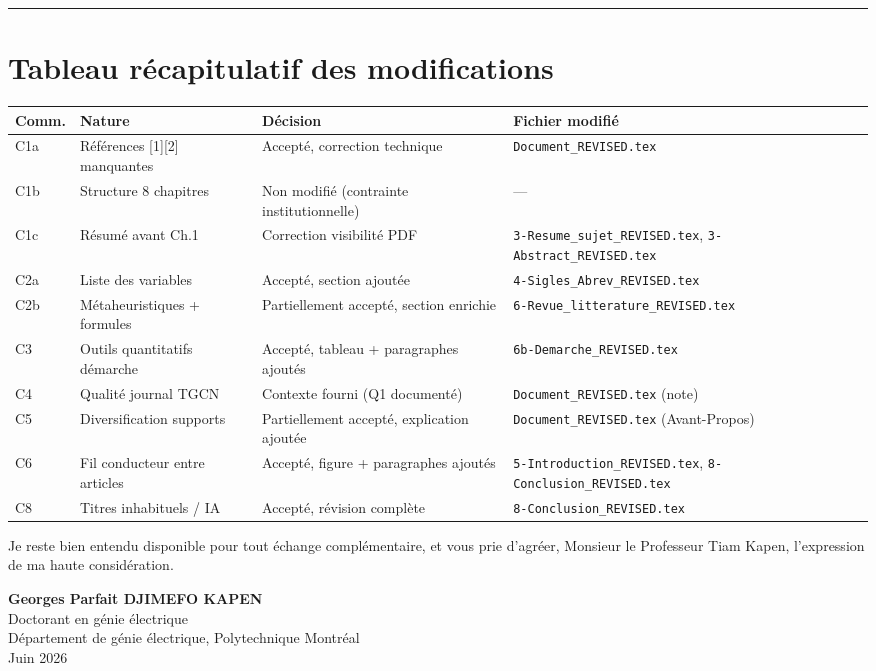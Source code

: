 \documentclass[12pt,a4paper]{article}
\begin{document}
\bigskip
\hrule
\bigskip

\section*{Tableau récapitulatif des modifications}

\begin{center}
\small
\begin{tabular}{p{1.5cm} p{4cm} p{3.5cm} p{4cm}}
\toprule
\textbf{Comm.} & \textbf{Nature} & \textbf{Décision} & \textbf{Fichier modifié} \\
\midrule
C1a & Références [1][2] manquantes & Accepté, correction technique & \texttt{Document\_REVISED.tex} \\
C1b & Structure 8 chapitres & Non modifié (contrainte institutionnelle) & --- \\
C1c & Résumé avant Ch.1 & Correction visibilité PDF & \texttt{3-Resume\_sujet\_REVISED.tex}, \texttt{3-Abstract\_REVISED.tex} \\
C2a & Liste des variables & Accepté, section ajoutée & \texttt{4-Sigles\_Abrev\_REVISED.tex} \\
C2b & Métaheuristiques + formules & Partiellement accepté, section enrichie & \texttt{6-Revue\_litterature\_REVISED.tex} \\
C3 & Outils quantitatifs démarche & Accepté, tableau + paragraphes ajoutés & \texttt{6b-Demarche\_REVISED.tex} \\
C4 & Qualité journal TGCN & Contexte fourni (Q1 documenté) & \texttt{Document\_REVISED.tex} (note) \\
C5 & Diversification supports & Partiellement accepté, explication ajoutée & \texttt{Document\_REVISED.tex} (Avant-Propos) \\
C6 & Fil conducteur entre articles & Accepté, figure + paragraphes ajoutés & \texttt{5-Introduction\_REVISED.tex}, \texttt{8-Conclusion\_REVISED.tex} \\
C8 & Titres inhabituels / IA & Accepté, révision complète & \texttt{8-Conclusion\_REVISED.tex} \\
\bottomrule
\end{tabular}
\end{center}

\bigskip

Je reste bien entendu disponible pour tout échange complémentaire, et vous prie d'agréer, Monsieur le Professeur Tiam Kapen, l'expression de ma haute considération.

\bigskip
\begin{flushright}
\textbf{Georges Parfait DJIMEFO KAPEN}\\
Doctorant en génie électrique\\
Département de génie électrique, Polytechnique Montréal\\
Juin 2026
\end{flushright}
\end{document}

